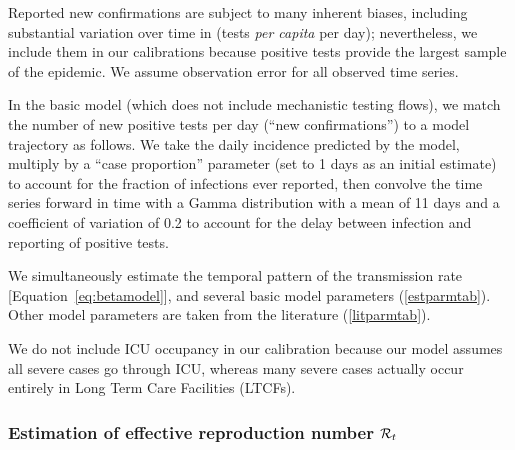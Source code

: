 \documentclass[12pt]{article}\usepackage[]{graphicx}\usepackage[]{color}
\begin{document}
Reported new confirmations are subject to many inherent biases,
including substantial variation over time in 
(\ie tests \emph{per capita} per day); nevertheless, we include them
in our calibrations because positive tests provide the largest sample
of the epidemic.  We assume
 observation error for all observed time series.

In the basic model (which does not include mechanistic testing flows),
we match the number of new positive tests per day (``new
confirmations'') to a model trajectory as follows.  We take the daily
incidence predicted by the model, multiply by a ``case proportion''
parameter  (set to 1 days as an
initial estimate) to account for the fraction of infections ever
reported, then convolve the time series forward in time with a Gamma
distribution with a mean of 11 days and a coefficient of
variation of 0.2 to account for the delay between infection
and reporting of positive tests.  


We simultaneously estimate the temporal pattern of the transmission
rate [Equation~\eqref{eq:betamodel}], and several basic model
parameters (\cref{estparmtab}).  Other model parameters
are taken from the literature (\cref{litparmtab}).

We do not include ICU occupancy in our calibration because
our model assumes all severe cases go through ICU, whereas
many severe cases actually occur entirely in Long Term Care Facilities
(LTCFs).  

\hypertarget{Rt}{}
\subsubsection*{Estimation of effective reproduction number ${\mathcal R}_t$}
\end{document}
